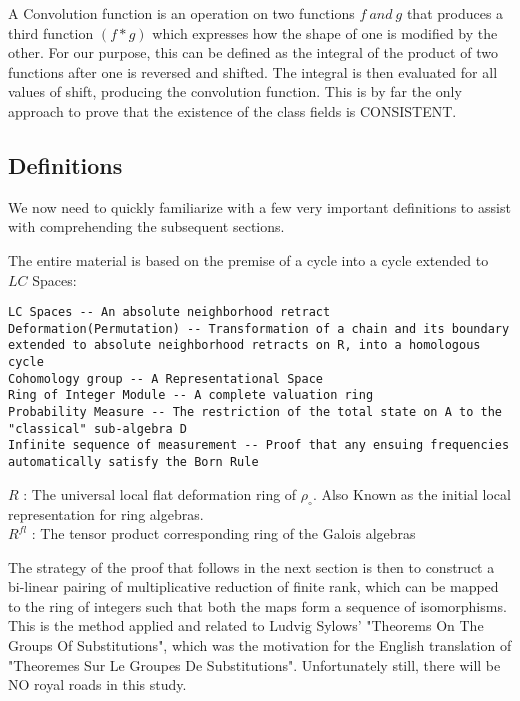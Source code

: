 \documentclass[11pt,fancy]{elegantbook}
\begin{document}
\begin{remark}
 A Convolution function is an operation on two functions ${f \ and \ g}$ that produces a third function $(f * g)$ which expresses how the shape of one is modified by the other. For our purpose, this can be defined as the integral of the product of two functions after one is reversed and shifted. The integral is then evaluated for all values of shift, producing the convolution function.
 This is by far the only approach to prove that the existence of the class fields is CONSISTENT.
\end{remark}

\subsection{Definitions}
We now need to quickly familiarize with a few very important definitions to assist with comprehending the subsequent sections. 

The entire material is based on the premise of a cycle into a cycle extended to $LC$ Spaces:

\begin{definition}
\begin{lstlisting}
LC Spaces -- An absolute neighborhood retract 
Deformation(Permutation) -- Transformation of a chain and its boundary extended to absolute neighborhood retracts on R, into a homologous cycle
Cohomology group -- A Representational Space
Ring of Integer Module -- A complete valuation ring
Probability Measure -- The restriction of the total state on A to the "classical" sub-algebra D
Infinite sequence of measurement -- Proof that any ensuing frequencies automatically satisfy the Born Rule 
\end{lstlisting}
\end{definition}


\begin{definition}
$R$ : The universal local flat deformation ring of ${\rho_\circ}$. Also Known as the initial local representation for ring algebras. \\
${R^{fl}}$ : The tensor product corresponding ring of the Galois algebras
\end{definition}

The strategy of the proof that follows in the next section is then to construct a bi-linear pairing of multiplicative reduction of finite rank, which can be mapped to the ring of integers such that both the maps form a sequence of isomorphisms.
This is the method applied and related to Ludvig Sylows' "Theorems On The Groups Of Substitutions", which was the motivation for the English translation of "Theoremes Sur Le Groupes De Substitutions".
Unfortunately still, there will be NO royal roads in this study.  
\end{document}
